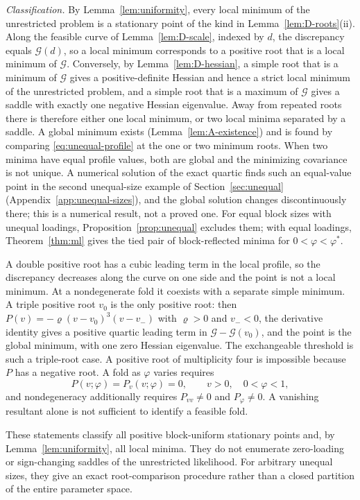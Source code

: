 \textit{Classification.} By Lemma~\ref{lem:uniformity}, every local minimum of the unrestricted problem is a stationary point of the kind in Lemma~\ref{lem:D-roots}(ii). Along the feasible curve of Lemma~\ref{lem:D-scale}, indexed by $d$, the discrepancy equals $\mathcal G(d)$, so a local minimum corresponds to a positive root that is a local minimum of $\mathcal G$. Conversely, by Lemma~\ref{lem:D-hessian}, a simple root that is a minimum of $\mathcal G$ gives a positive-definite Hessian and hence a strict local minimum of the unrestricted problem, and a simple root that is a maximum of $\mathcal G$ gives a saddle with exactly one negative Hessian eigenvalue. Away from repeated roots there is therefore either one local minimum, or two local minima separated by a saddle. A global minimum exists (Lemma~\ref{lem:A-existence}) and is found by comparing \eqref{eq:unequal-profile} at the one or two minimum roots. When two minima have equal profile values, both are global and the minimizing covariance is not unique. A numerical solution of the exact quartic finds such an equal-value point in the second unequal-size example of Section~\ref{sec:unequal} (Appendix~\ref{app:unequal-sizes}), and the global solution changes discontinuously there; this is a numerical result, not a proved one. For equal block sizes with unequal loadings, Proposition~\ref{prop:unequal} excludes them; with equal loadings, Theorem~\ref{thm:ml} gives the tied pair of block-reflected minima for $0<\varphi<\varphi^*$.

A double positive root has a cubic leading term in the local profile, so the discrepancy decreases along the curve on one side and the point is not a local minimum. At a nondegenerate fold it coexists with a separate simple minimum. A triple positive root $v_0$ is the only positive root: then $P(v)=-\varrho(v-v_0)^3(v-v_-)$ with $\varrho>0$ and $v_-<0$, the derivative identity gives a positive quartic leading term in $\mathcal G-\mathcal G(v_0)$, and the point is the global minimum, with one zero Hessian eigenvalue. The exchangeable threshold is such a triple-root case. A positive root of multiplicity four is impossible because $P$ has a negative root. A fold as $\varphi$ varies requires
\[
P(v;\varphi)=P_v(v;\varphi)=0,
\qquad v>0,\quad 0<\varphi<1,
\]
and nondegeneracy additionally requires $P_{vv}\ne0$ and $P_\varphi\ne0$. A vanishing resultant alone is not sufficient to identify a feasible fold.

These statements classify all positive block-uniform stationary points and, by Lemma~\ref{lem:uniformity}, all local minima. They do not enumerate zero-loading or sign-changing saddles of the unrestricted likelihood. For arbitrary unequal sizes, they give an exact root-comparison procedure rather than a closed partition of the entire parameter space.


